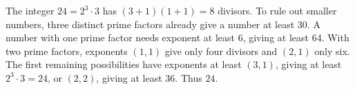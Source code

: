 The integer $24=2^3\cdot3$ has $(3+1)(1+1)=8$ divisors. To rule out smaller numbers, three distinct prime factors already give a number at least 30. A number with one prime factor needs exponent at least 6, giving at least 64. With two prime factors, exponents $(1,1)$ give only four divisors and $(2,1)$ only six. The first remaining possibilities have exponents at least $(3,1)$, giving at least $2^3\cdot3=24$, or $(2,2)$, giving at least 36. Thus $\boxed{24}$.
